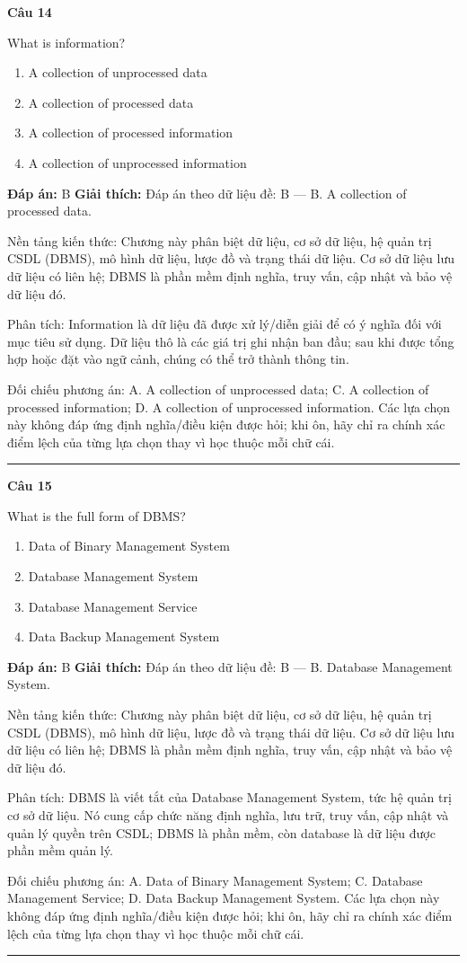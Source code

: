 \documentclass[11pt,a4paper]{article}
\newenvironment{question}[1]{%
  \par\vspace{1em}\noindent\textbf{\large Câu #1}\par\vspace{0.4em}
}{%
  \par\vspace{1em}\hrule\vspace{0.6em}
}
\newenvironment{choices}{%
  \begin{enumerate}[label=\textbf{\Alph*.},leftmargin=2.2em,itemsep=2pt,topsep=3pt]
}{%
  \end{enumerate}
}
\newcommand{\choice}{\item}
\begin{document}
\begin{question}{14}
What is information?
\begin{choices}
\choice A collection of unprocessed data
\choice A collection of processed data
\choice A collection of processed information
\choice A collection of unprocessed information
\end{choices}
\textbf{Đáp án:} B
\textbf{Giải thích:} Đáp án theo dữ liệu đề: B — B. A collection of processed data.

Nền tảng kiến thức: Chương này phân biệt dữ liệu, cơ sở dữ liệu, hệ quản trị CSDL (DBMS), mô hình dữ liệu, lược đồ và trạng thái dữ liệu. Cơ sở dữ liệu lưu dữ liệu có liên hệ; DBMS là phần mềm định nghĩa, truy vấn, cập nhật và bảo vệ dữ liệu đó.

Phân tích: Information là dữ liệu đã được xử lý/diễn giải để có ý nghĩa đối với mục tiêu sử dụng. Dữ liệu thô là các giá trị ghi nhận ban đầu; sau khi được tổng hợp hoặc đặt vào ngữ cảnh, chúng có thể trở thành thông tin.

Đối chiếu phương án: A. A collection of unprocessed data; C. A collection of processed information; D. A collection of unprocessed information. Các lựa chọn này không đáp ứng định nghĩa/điều kiện được hỏi; khi ôn, hãy chỉ ra chính xác điểm lệch của từng lựa chọn thay vì học thuộc mỗi chữ cái.
\end{question}


\begin{question}{15}
What is the full form of DBMS?
\begin{choices}
\choice Data of Binary Management System
\choice Database Management System
\choice Database Management Service
\choice Data Backup Management System
\end{choices}
\textbf{Đáp án:} B
\textbf{Giải thích:} Đáp án theo dữ liệu đề: B — B. Database Management System.

Nền tảng kiến thức: Chương này phân biệt dữ liệu, cơ sở dữ liệu, hệ quản trị CSDL (DBMS), mô hình dữ liệu, lược đồ và trạng thái dữ liệu. Cơ sở dữ liệu lưu dữ liệu có liên hệ; DBMS là phần mềm định nghĩa, truy vấn, cập nhật và bảo vệ dữ liệu đó.

Phân tích: DBMS là viết tắt của Database Management System, tức hệ quản trị cơ sở dữ liệu. Nó cung cấp chức năng định nghĩa, lưu trữ, truy vấn, cập nhật và quản lý quyền trên CSDL; DBMS là phần mềm, còn database là dữ liệu được phần mềm quản lý.

Đối chiếu phương án: A. Data of Binary Management System; C. Database Management Service; D. Data Backup Management System. Các lựa chọn này không đáp ứng định nghĩa/điều kiện được hỏi; khi ôn, hãy chỉ ra chính xác điểm lệch của từng lựa chọn thay vì học thuộc mỗi chữ cái.
\end{question}
\end{document}
